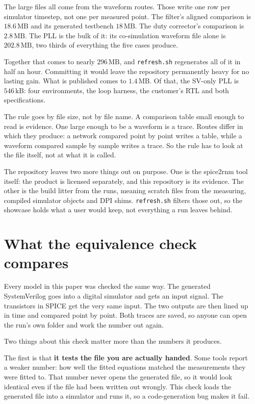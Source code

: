 \documentclass[11pt,a4paper]{article}
\newcommand{\unit}[1]{\,\textrm{#1}}
\begin{document}
The large files all come from the waveform routes. Those write one row
per simulator timestep, not one per measured point. The filter's
aligned comparison is $18.6\unit{MB}$ and its generated testbench
$18\unit{MB}$. The duty corrector's comparison is $2.8\unit{MB}$. The
PLL is the bulk of it: its co-simulation waveform file alone is
$202.8\unit{MB}$, two thirds of everything the five cases produce.

Together that comes to nearly $296\unit{MB}$, and
\texttt{refresh.sh} regenerates all of it in half an hour. Committing
it would leave the repository permanently heavy for no lasting gain.
What is published comes to $1.4\unit{MB}$. Of that, the SV-only PLL is
$546\unit{kB}$: four environments, the loop harness, the customer's
RTL and both specifications.

The rule goes by file size, not by file name. A comparison table small
enough to read is evidence. One large enough to be a waveform is a
trace. Routes differ in which they produce: a network compared point
by point writes a table, while a waveform compared sample by sample
writes a trace. So the rule has to look at the file itself, not at
what it is called.

\noindent The repository leaves two more things out on purpose. One is
the spice2rnm tool itself: the product is licensed separately, and
this repository is its evidence. The other is the build litter from
the runs, meaning scratch files from the measuring, compiled simulator
objects and DPI shims. \texttt{refresh.sh} filters those out, so the
showcase holds what a user would keep, not everything a run leaves
behind.

\section{What the equivalence check compares}
\label{sec:equiv}

Every model in this paper was checked the same way. The generated
SystemVerilog goes into a digital simulator and gets an input signal.
The transistors in SPICE get the very same input. The two outputs are
then lined up in time and compared point by point. Both traces are
saved, so anyone can open the run's own folder and work the number out
again.

Two things about this check matter more than the numbers it
produces.

The first is that \textbf{it tests the file you are actually handed}.
Some tools report a weaker number: how well the fitted equations
matched the measurements they were fitted to. That number never opens
the generated file, so it would look identical even if the file had
been written out wrongly. This check loads the generated file into a
simulator and runs it, so a code-generation bug makes it fail.
\end{document}
